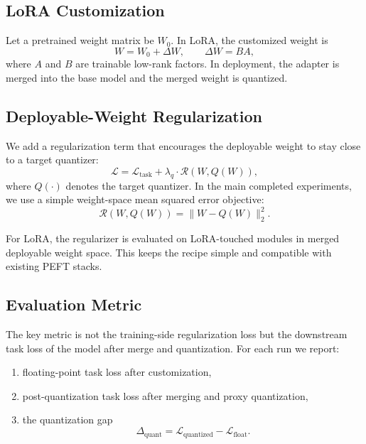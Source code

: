 \documentclass[11pt]{article}
\begin{document}
\subsection{LoRA Customization}

Let a pretrained weight matrix be $W_0$. In LoRA, the customized weight is
\begin{equation}
W = W_0 + \Delta W, \qquad \Delta W = BA,
\end{equation}
where $A$ and $B$ are trainable low-rank factors. In deployment, the adapter is merged into the base model and the merged weight is quantized.

\subsection{Deployable-Weight Regularization}

We add a regularization term that encourages the deployable weight to stay close to a target quantizer:
\begin{equation}
\mathcal{L} = \mathcal{L}_{\text{task}} + \lambda_q \cdot \mathcal{R}(W, Q(W)),
\end{equation}
where $Q(\cdot)$ denotes the target quantizer. In the main completed experiments, we use a simple weight-space mean squared error objective:
\begin{equation}
\mathcal{R}(W, Q(W)) = \lVert W - Q(W)\rVert_2^2.
\end{equation}

For LoRA, the regularizer is evaluated on LoRA-touched modules in merged deployable weight space. This keeps the recipe simple and compatible with existing PEFT stacks.

\subsection{Evaluation Metric}

The key metric is not the training-side regularization loss but the downstream task loss of the model after merge and quantization. For each run we report:
\begin{enumerate}
    \item floating-point task loss after customization,
    \item post-quantization task loss after merging and proxy quantization,
    \item the quantization gap
    \begin{equation}
    \Delta_{\text{quant}} = \mathcal{L}_{\text{quantized}} - \mathcal{L}_{\text{float}}.
    \end{equation}
\end{enumerate}
\end{document}
